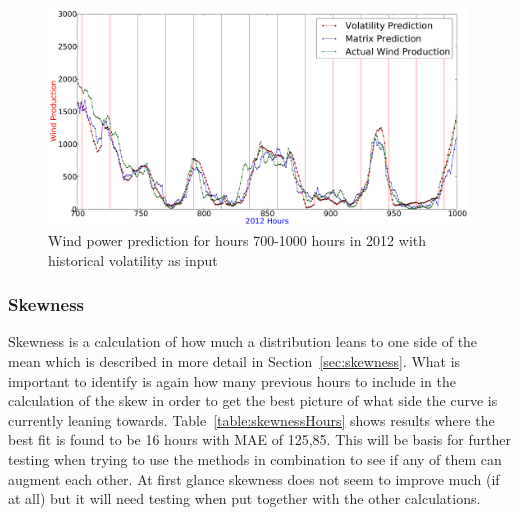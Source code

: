 \begin{figure}[h!]
\centering
\includegraphics[width=0.99\textwidth]{billeder/volatilityBest700-1000.png}
\caption{Wind power prediction for hours 700-1000 hours in 2012 with historical volatility as input}
\label{fig:volatilityBest700-1000}
\end{figure} 

\subsubsection{Skewness}
Skewness is a calculation of how much a distribution leans to one side of the mean which is described in more detail in Section~\ref{sec:skewness}. What is important to identify is again how many previous hours to include in the calculation of the skew in order to get the best picture of what side the curve is currently leaning towards. Table~\ref{table:skewnessHours} shows results where the best fit is found to be 16 hours with MAE of 125,85. This will be basis for further testing when trying to use the methods in combination to see if any of them can augment each other. At first glance skewness does not seem to improve much (if at all) but it will need testing when put together with the other calculations.

